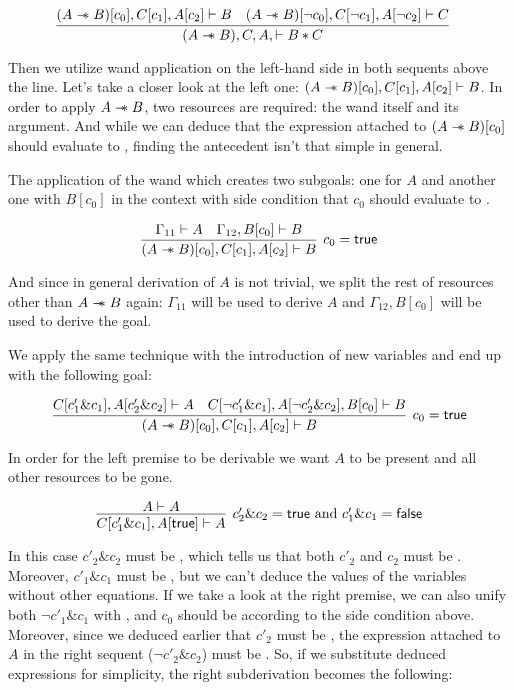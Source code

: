 \[\hspace{-0.03\linewidth}
\infer{(A \wand B), C, A, \vdash B \ast C}
      {(A \wand B)[c_0], C[c_1], A[c_2] \vdash B  &
       (A \wand B)[\neg c_0], C[\neg c_1] , A[\neg c_2] \vdash C}
\]

Then we utilize wand application on the left-hand side in both sequents above the line.
Let's take a closer look at the left one: \((A \mathrel{-\mkern-6mu*} B)[c_0], C[c_1], A[c_2] \vdash B\).
In order to apply \(A \mathrel{-\mkern-6mu*} B\), two resources are required: the wand itself and its argument.
And while we can deduce that the expression attached to \((A \mathrel{-\mkern-6mu*} B)[c_0]\) should evaluate to \true, finding the antecedent isn't that simple in general.

The application of the wand which creates two subgoals: one for \(A\) and another one with \(B[c_0]\) in the context with side condition that \(c_0\) should evaluate to \true.

\[
\infer[c_0 = \true]
      {(A \wand B)[c_0], C[c_1], A[c_2] \vdash B}
      { \Gamma_{11} \vdash A &
        \Gamma_{12}, B[c_0] \vdash B}
\]

And since in general derivation of \(A\) is not trivial, we split the rest of resources other than \(A \mathrel{-\mkern-6mu*} B\) again: \(\Gamma_{11}\) will be used to derive \(A\) and \(\Gamma_{12}, B[c_0]\) will be used to derive the goal.

We apply the same technique with the introduction of new variables and end up with the following goal:

\[
\infer[c_0 = \true]
      {(A \wand B)[c_0], C[c_1], A[c_2] \vdash B}
      {C[c'_1 \& c_1], A[c'_2 \& c_2] \vdash A &
       C[\neg c'_1 \& c_1], A[\neg c'_2 \& c_2], B[c_0] \vdash B}
\]

In order for the left premise to be derivable we want \(A\) to be present and all other resources to be gone.

\[
\infer[c'_2 \& c_2 = \true \text{ and } c'_1\& c_1 = \false]
      {C [c'_1\& c_1], A[\true] \vdash A}
      {A \vdash A}
\]

In this case \(c'_2 \& c_2\) must be \true, which tells us that both \(c'_2\) and \(c_2\) must be \true.
Moreover, \(c'_1 \& c_1\) must be \false, but we can't deduce the values of the variables without other equations.
If we take a look at the right premise, we can also unify both \(\neg c'_1 \& c_1\) with \false, and \(c_0\) should be \true according to the side condition above.
Moreover, since we deduced earlier that \(c'_2\) must be \true, the expression attached to \(A\) in the right sequent (\(\neg c'_2 \& c_2\)) must be \false.
So, if we substitute deduced expressions for simplicity, the right subderivation becomes the following:

